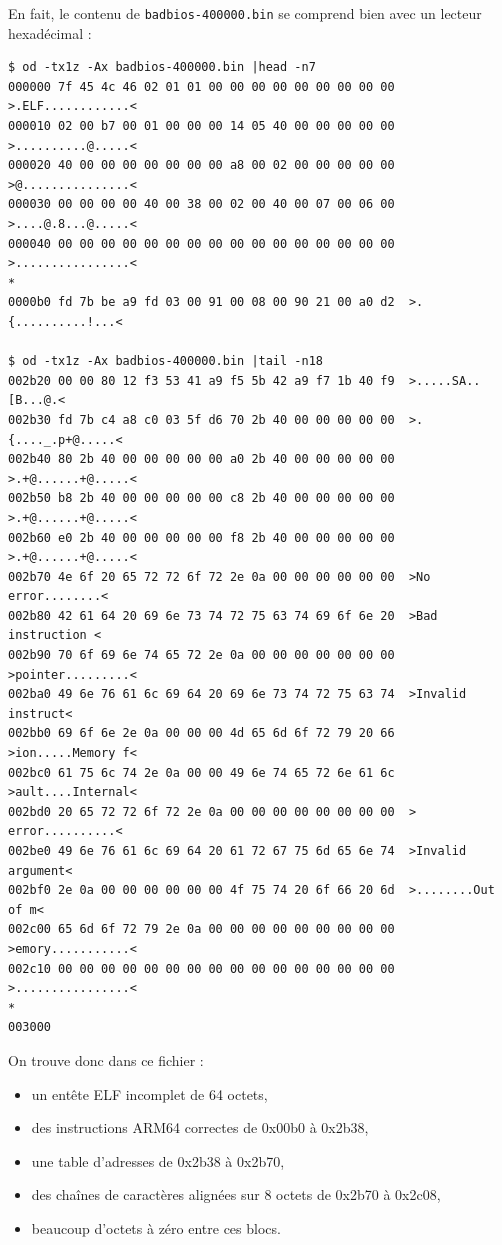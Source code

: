 \documentclass[a4paper,10pt]{article}
\begin{document}
En fait, le contenu de \texttt{badbios-400000.bin} se comprend bien avec un lecteur hexadécimal :
\begin{verbatim}
$ od -tx1z -Ax badbios-400000.bin |head -n7
000000 7f 45 4c 46 02 01 01 00 00 00 00 00 00 00 00 00  >.ELF............<
000010 02 00 b7 00 01 00 00 00 14 05 40 00 00 00 00 00  >..........@.....<
000020 40 00 00 00 00 00 00 00 a8 00 02 00 00 00 00 00  >@...............<
000030 00 00 00 00 40 00 38 00 02 00 40 00 07 00 06 00  >....@.8...@.....<
000040 00 00 00 00 00 00 00 00 00 00 00 00 00 00 00 00  >................<
*
0000b0 fd 7b be a9 fd 03 00 91 00 08 00 90 21 00 a0 d2  >.{..........!...<

$ od -tx1z -Ax badbios-400000.bin |tail -n18
002b20 00 00 80 12 f3 53 41 a9 f5 5b 42 a9 f7 1b 40 f9  >.....SA..[B...@.<
002b30 fd 7b c4 a8 c0 03 5f d6 70 2b 40 00 00 00 00 00  >.{...._.p+@.....<
002b40 80 2b 40 00 00 00 00 00 a0 2b 40 00 00 00 00 00  >.+@......+@.....<
002b50 b8 2b 40 00 00 00 00 00 c8 2b 40 00 00 00 00 00  >.+@......+@.....<
002b60 e0 2b 40 00 00 00 00 00 f8 2b 40 00 00 00 00 00  >.+@......+@.....<
002b70 4e 6f 20 65 72 72 6f 72 2e 0a 00 00 00 00 00 00  >No error........<
002b80 42 61 64 20 69 6e 73 74 72 75 63 74 69 6f 6e 20  >Bad instruction <
002b90 70 6f 69 6e 74 65 72 2e 0a 00 00 00 00 00 00 00  >pointer.........<
002ba0 49 6e 76 61 6c 69 64 20 69 6e 73 74 72 75 63 74  >Invalid instruct<
002bb0 69 6f 6e 2e 0a 00 00 00 4d 65 6d 6f 72 79 20 66  >ion.....Memory f<
002bc0 61 75 6c 74 2e 0a 00 00 49 6e 74 65 72 6e 61 6c  >ault....Internal<
002bd0 20 65 72 72 6f 72 2e 0a 00 00 00 00 00 00 00 00  > error..........<
002be0 49 6e 76 61 6c 69 64 20 61 72 67 75 6d 65 6e 74  >Invalid argument<
002bf0 2e 0a 00 00 00 00 00 00 4f 75 74 20 6f 66 20 6d  >........Out of m<
002c00 65 6d 6f 72 79 2e 0a 00 00 00 00 00 00 00 00 00  >emory...........<
002c10 00 00 00 00 00 00 00 00 00 00 00 00 00 00 00 00  >................<
*
003000
\end{verbatim}

On trouve donc dans ce fichier :
\begin{itemize}
\item un entête ELF incomplet de 64 octets,
\item des instructions ARM64 correctes de 0x00b0 à 0x2b38,
\item une table d'adresses de 0x2b38 à 0x2b70,
\item des chaînes de caractères alignées sur 8 octets de 0x2b70 à 0x2c08,
\item beaucoup d'octets à zéro entre ces blocs.
\end{itemize}
\end{document}
